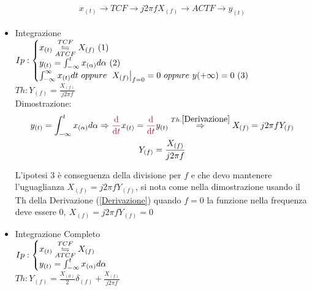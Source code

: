 \begin{itemize}
{                    \begin{gather}
                        x_{(t)} \rightarrow TCF \rightarrow j2\pi fX_{(f)} \rightarrow ACTF \rightarrow y_{(t)}\nonumber
                    \end{gather}
                }
                \item{Integrazione\\
                    $Ip:\begin{cases}
                        x_{(t)} \overunderset{TCF}{ATCF}{\leftrightharpoons} X_{(f)}\ (1)\\
                        y_{(t)} = \int_{-\infty}^{t} x_{(\alpha)} d\alpha\ (2) \\
                        \int_{-\infty}^{\infty} x_{(t)} dt\ oppure\ \eval*{X_{(f)}}_{f=0} = 0 \ oppure\ y{(+\infty)} = 0\ (3) \\
                    \end{cases}$\\
                    $Th: Y_{(f)} =\frac{X_{(f)}}{j2\pi f}$ \\
                    Dimostrazione:\\
                    \begin{gather}
                        y_{(t)} = \int_{-\infty}^{t} x_{(\alpha)} d\alpha \Rightarrow {\color{purple}\derivative{}{t}} x_{(t)} = {\color{purple}\derivative{}{t}} y_{(t)} \overset{Th. \ref{Derivazione}}{\Rightarrow}  X_{(f)} = j2\pi f Y_{(f)} \nonumber\\
                                Y_{(f)} =\frac{X_{(f)}}{j2\pi f}\nonumber
                    \end{gather}
        
                    L'ipotesi 3 è conseguenza della divisione per $f$ e che devo mantenere l'uguaglianza $X_{(f)} = j2\pi f Y_{(f)}$, si nota come nella dimostrazione usando il Th della Derivazione (\ref{Derivazione})
                    quando $f=0$ la funzione nella frequenza deve essere $0,\ X_{(f)} = j2\pi f Y_{(f)} = 0$ 
                
                }
                \item{Integrazione Completo\\
                    $Ip:\begin{cases}
                        x_{(t)} \overunderset{TCF}{ATCF}{\leftrightharpoons} X_{(f)}\\
                        y_{(t)} = \int_{-\infty}^{t} x_{(\alpha)} d\alpha
                    \end{cases}$\\
                    $Th: Y_{(f)} =\frac{X_{(0)}}{2}\delta_{(f)} +\frac{X_{(f)}}{j2\pi f}$ \\
                    
}
\end{itemize}
